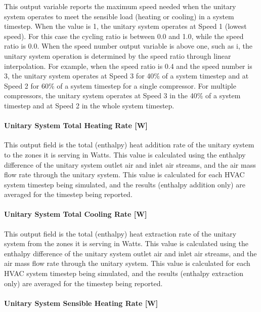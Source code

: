 This output variable reports the maximum speed needed when the unitary system operates to meet the sensible load (heating or cooling) in a system timestep. When the value is 1, the unitary system operates at Speed 1 (lowest speed). For this case the cycling ratio is between 0.0 and 1.0, while the speed ratio is 0.0. When the speed number output variable is above one, such as i, the unitary system operation is determined by the speed ratio through linear interpolation. For example, when the speed ratio is 0.4 and the speed number is 3, the unitary system operates at Speed 3 for 40\% of a system timestep and at Speed 2 for 60\% of a system timestep for a single compressor. For multiple compressors, the unitary system operates at Speed 3 in the 40\% of a system timestep and at Speed 2 in the whole system timestep.

\paragraph{Unitary System Total Heating Rate {[}W{]}}\label{unitary-system-total-heating-rate-w}

This output field is the total (enthalpy) heat addition rate of the unitary system to the zones it is serving in Watts. This value is calculated using the enthalpy difference of the unitary system outlet air and inlet air streams, and the air mass flow rate through the unitary system. This value is calculated for each HVAC system timestep being simulated, and the results (enthalpy addition only) are averaged for the timestep being reported.

\paragraph{Unitary System Total Cooling Rate {[}W{]}}\label{unitary-system-total-cooling-rate-w}

This output field is the total (enthalpy) heat extraction rate of the unitary system from the zones it is serving in Watts. This value is calculated using the enthalpy difference of the unitary system outlet air and inlet air streams, and the air mass flow rate through the unitary system. This value is calculated for each HVAC system timestep being simulated, and the results (enthalpy extraction only) are averaged for the timestep being reported.

\paragraph{Unitary System Sensible Heating Rate {[}W{]}}\label{unitary-system-sensible-heating-rate-w}

